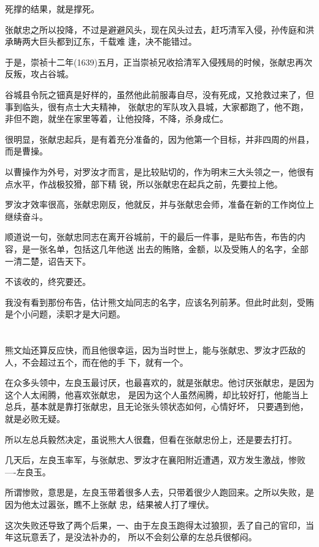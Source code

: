 \documentclass[11pt,a4paper,onecolumn]{article}
\begin{document}
死撑的结果，就是撑死。

张献忠之所以投降，不过是避避风头，现在风头过去，赶巧清军入侵，孙传庭和洪承畴两大巨头都到辽东，千载难
逢，决不能错过。

于是，崇祯十二年(1639)五月，正当崇祯兄收拾清军入侵残局的时候，张献忠再次反叛，攻占谷城。

谷城县令阮之钿真是好样的，虽然他此前服毒自尽，没有死成，又抢救过来了，但事到临头，很有点士大夫精神，
张献忠的军队攻入县城，大家都跑了，他不跑，非但不跑，就坐在家里等着，让他投降，不降，杀身成仁。

很明显，张献忠起兵，是有着充分准备的，因为他第一个目标，并非四周的州县，而是曹操。

以曹操作为外号，对罗汝才而言，是比较贴切的，作为明末三大头领之一，他很有点水平，作战极狡猾，部下精
锐，所以张献忠在起兵之前，先要拉上他。

罗汝才效率很高，张献忠刚反，他就反，并与张献忠会师，准备在新的工作岗位上继续奋斗。

顺道说一句，张献忠同志在离开谷城前，干的最后一件事，是贴布告，布告的内容，是一张名单，包括这几年他送
出去的贿赂，金额，以及受贿人的名字，全部一清二楚，诏告天下。

不该收的，终究要还。

我没有看到那份布告，估计熊文灿同志的名字，应该名列前茅。但此时此刻，受贿是个小问题，渎职才是大问题。

\section[\thesection]{}

熊文灿还算反应快，而且他很幸运，因为当时世上，能与张献忠、罗汝才匹敌的人，不会超过五个，而在他的手
下，就有一个。

在众多头领中，左良玉最讨厌，也最喜欢的，就是张献忠。他讨厌张献忠，是因为这个人太闹腾，他喜欢张献忠，
是因为这个人虽然闹腾，却比较好打，他能当上总兵，基本就是靠打张献忠，且无论张头领状态如何，心情好坏，
只要遇到他，就是必败无疑。

所以左总兵毅然决定，虽说熊大人很蠢，但看在张献忠份上，还是要去打打。

几天后，左良玉率军，与张献忠、罗汝才在襄阳附近遭遇，双方发生激战，惨败----左良玉。

所谓惨败，意思是，左良玉带着很多人去，只带着很少人跑回来。之所以失败，是因为他太过嚣张，瞧不上张献
忠，结果被人打了埋伏。

这次失败还导致了两个后果，一、由于左良玉跑得太过狼狈，丢了自己的官印，当年这玩意丢了，是没法补办的，
所以不会刻公章的左总兵很郁闷。
\end{document}
